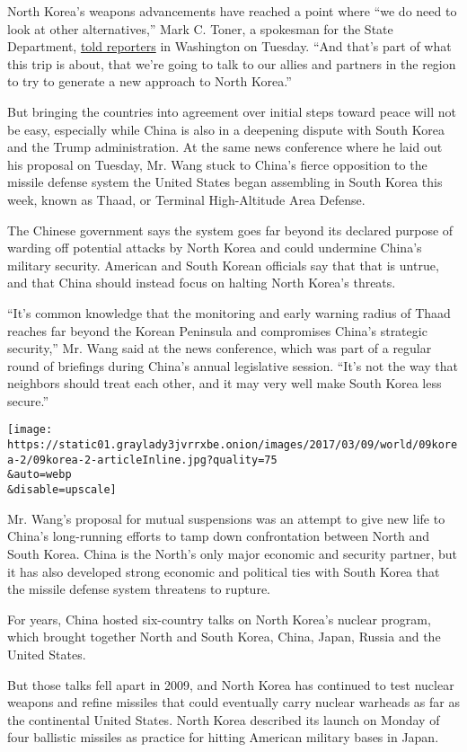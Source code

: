 North Korea's weapons advancements have reached a point where ``we do
need to look at other alternatives,'' Mark C. Toner, a spokesman for the
State Department,
\href{https://www.state.gov/r/pa/prs/dpb/2017/03/268288.htm}{told
reporters} in Washington on Tuesday. ``And that's part of what this trip
is about, that we're going to talk to our allies and partners in the
region to try to generate a new approach to North Korea.''

But bringing the countries into agreement over initial steps toward
peace will not be easy, especially while China is also in a deepening
dispute with South Korea and the Trump administration. At the same news
conference where he laid out his proposal on Tuesday, Mr. Wang stuck to
China's fierce opposition to the missile defense system the United
States began assembling in South Korea this week, known as Thaad, or
Terminal High-Altitude Area Defense.

The Chinese government says the system goes far beyond its declared
purpose of warding off potential attacks by North Korea and could
undermine China's military security. American and South Korean officials
say that that is untrue, and that China should instead focus on halting
North Korea's threats.

``It's common knowledge that the monitoring and early warning radius of
Thaad reaches far beyond the Korean Peninsula and compromises China's
strategic security,'' Mr. Wang said at the news conference, which was
part of a regular round of briefings during China's annual legislative
session. ``It's not the way that neighbors should treat each other, and
it may very well make South Korea less secure.''

\texttt{[image: https://static01.graylady3jvrrxbe.onion/images/2017/03/09/world/09korea-2/09korea-2-articleInline.jpg?quality=75\\\&auto=webp\\\&disable=upscale]}

Mr. Wang's proposal for mutual suspensions was an attempt to give new
life to China's long-running efforts to tamp down confrontation between
North and South Korea. China is the North's only major economic and
security partner, but it has also developed strong economic and
political ties with South Korea that the missile defense system
threatens to rupture.

For years, China hosted six-country talks on North Korea's nuclear
program, which brought together North and South Korea, China, Japan,
Russia and the United States.

But those talks fell apart in 2009, and North Korea has continued to
test nuclear weapons and refine missiles that could eventually carry
nuclear warheads as far as the continental United States. North Korea
described its launch on Monday of four ballistic missiles as practice
for hitting American military bases in Japan.

